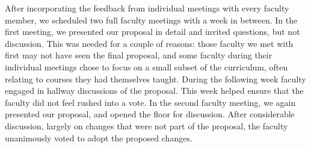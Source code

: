 \documentclass[english,aps,pra,reprint,noshowpacs,superscriptaddress]{revtex4-1}
\begin{document}
After incorporating the feedback from  individual meetings with every
faculty member, we scheduled
two full faculty meetings with a week in between.  In the first meeting,
we presented our proposal in detail and invited questions, but not discussion.
This was needed for a couple of reasons:  those faculty we met with first
may not have seen the final proposal, and some faculty during their
individual meetings chose to focus on a small subset of the
curriculum, often relating to courses they had themselves taught.
During the following week faculty engaged in hallway discussions of the proposal.
This week helped ensure that the faculty did not feel rushed into a vote.
In the second faculty meeting, we again presented our proposal, and opened
the floor for discussion.  After considerable discussion, largely on
changes that were not part of the proposal, the faculty unanimously voted to adopt
the proposed changes.
\end{document}
